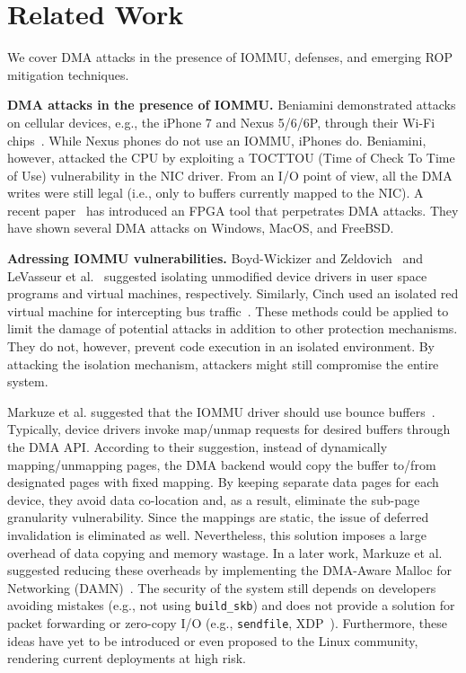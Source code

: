 \section{Related Work}
We cover DMA attacks in the presence of IOMMU, defenses, and emerging ROP mitigation techniques.

\smallskip
\noindent\textbf{DMA attacks in the presence of IOMMU.}
Beniamini demonstrated attacks on cellular devices, e.g., the iPhone 7 and Nexus 5/6/6P, through their Wi-Fi chips~\cite{Ben17a, Ben17b}. While Nexus phones do not use an IOMMU, iPhones do. Beniamini, however, attacked the CPU by exploiting a TOCTTOU (Time of Check To Time of Use) vulnerability in the NIC driver. From an I/O point of view, all the DMA writes were still legal (i.e., only to buffers currently mapped to the NIC). A recent paper~\cite{thunder} has introduced an FPGA tool that perpetrates DMA attacks. They have shown several \simple DMA attacks on Windows, MacOS, and FreeBSD.

\smallskip
\noindent\textbf{Adressing IOMMU vulnerabilities.}
Boyd-Wickizer and Zeldovich~\cite{BWZ10} and LeVasseur et al.~\cite{LUSG04} suggested isolating unmodified device drivers in user space programs and virtual machines, respectively. Similarly, Cinch used an isolated red virtual machine for intercepting bus traffic~\cite{AWH16}. These methods could be applied to limit the damage of potential attacks in addition to other protection mechanisms. They do not, however, prevent code execution in an isolated environment. By attacking the isolation mechanism, attackers might still compromise the entire system.

Markuze et al. suggested that the IOMMU driver should use bounce buffers~\cite{MMT16}. Typically, device drivers invoke map/unmap requests for desired buffers through the DMA API. According to their suggestion, instead of dynamically mapping/unmapping pages, the DMA backend would copy the buffer to/from designated pages with fixed mapping. By keeping separate data pages for each device, they avoid data co-location and, as a result, eliminate the sub-page granularity vulnerability. Since the mappings are static, the issue of deferred invalidation is eliminated as well. 
%
Nevertheless, this solution imposes a large overhead of data copying and memory wastage. In a later work, Markuze et al. suggested reducing these overheads by implementing the DMA-Aware Malloc for Networking (DAMN)~\cite{MSMT18}. The security of the system still depends on developers avoiding mistakes (e.g., not using \texttt{build\_skb}) and does not provide a solution for packet forwarding or zero-copy I/O (e.g., \texttt{sendfile}, XDP~\cite{xdp}). Furthermore, these ideas have yet to be introduced or even proposed to the Linux community, rendering current deployments at high risk.

